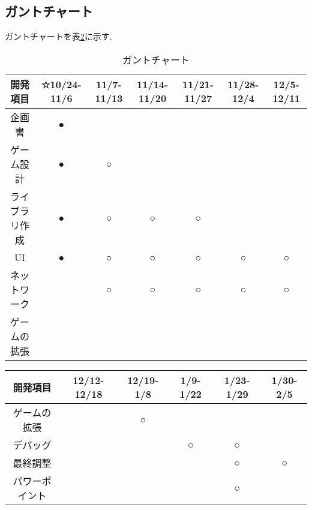 \documentclass{jarticle}
\begin{document}
\subsection{ガントチャート}
ガントチャートを表\ref{gun}に示す.
\begin{table}[hbtp]
\caption{ガントチャート}
\begin{center}
\begin{tabular}{|c||c|c|c|c|c|c|}

\hline
開発項目 & ☆10/24-11/6 & 11/7-11/13 & 11/14-11/20 & 11/21-11/27 & 11/28-12/4 & 12/5-12/11 \\
\hline \hline
企画書 & ● & & & & & \\ \hline
ゲーム設計 & ● & ○& & & & \\ \hline
ライブラリ作成 &● & ○ &○ & ○& & \\ \hline  
UI & ●& ○  & ○& ○& ○& ○\\ \hline
ネットワーク & & ○ &○ & ○& ○&○ \\ \hline
ゲームの拡張 & &  & & & & \\ \hline

\end{tabular}
\end{center}
\label{gun}
\end{table}

\begin{table}[hbtp]
\begin{center}
\begin{tabular}{|c||c|c|c|c|c|}
\hline
開発項目 & 12/12-12/18 & 12/19-1/8 & 1/9-1/22 & 1/23-1/29 & 1/30-2/5 \\
\hline \hline
ゲームの拡張 & & ○  & & & \\ \hline
デバッグ & &   & ○& ○ & \\ \hline
最終調整 & & & & ○&○ \\ \hline
パワーポイント & & & & ○ & \\ \hline

\end{tabular}
\end{center}
\label{gun}
\end{table}
\end{document}
